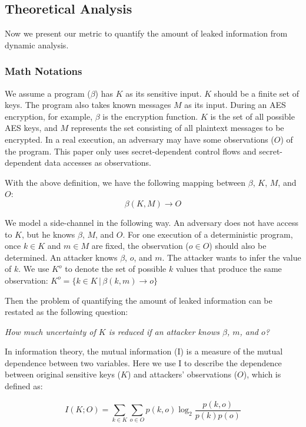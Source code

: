 \subsection{Theoretical Analysis}
Now we present our metric to quantify the amount of leaked information from
dynamic analysis.

\subsubsection{Math Notations}
We assume a program ($\beta$) has $K$ as its sensitive input. $K$ should be 
a finite set of keys. The program also takes known messages $M$ as its input. 
During an AES encryption, for example, 
$\beta$ is the encryption function. $K$ is the set of all possible AES keys, 
and $M$ represents the set consisting of all plaintext messages to be encrypted. In a real execution, an adversary may have 
some observations ($O$) of the program. This paper only
uses secret-dependent control flows and secret-dependent data 
accesses as observations.

With the above definition, we have the following mapping between $\beta$,
$K$, $M$, and $O$:
\begin{displaymath}
    \beta(K, M) \rightarrow O
\end{displaymath}


We model a side-channel in the following way. An adversary does not have
access to $K$, but he knows $\beta$, $M$, and $O$. For one execution of a
deterministic program, once $k \in K$ and $m \in M$ are fixed, the observation
($o \in O$) should also be determined. An attacker knows $\beta$, $o$,
and $m$. The attacker wants to infer the value of $k$. We use $K^o$ to denote
the set of possible $k$ values that produce the same observation: $K^o = \{ k \in K \, |\, \beta(k, m) \rightarrow o\}$

Then the problem of quantifying the amount of leaked information can be
restated as the following question:

\emph{How much uncertainty of $K$ is reduced if an attacker knows $\beta$, $m$, and $o$?}

In information theory, the mutual information (I) is a measure of the mutual
dependence between two variables. Here we use I to describe the
dependence between original sensitive keys ($K$) and attackers' observations ($O$),
which is defined as:

\begin{equation} \label{eq:1}
    I(K;O) = \sum_{k {\in} K}{\sum_{o {\in} O}{p(k, o)\log_2\frac{p(k, o)}{p(k)p(o)}}}
\end{equation}

